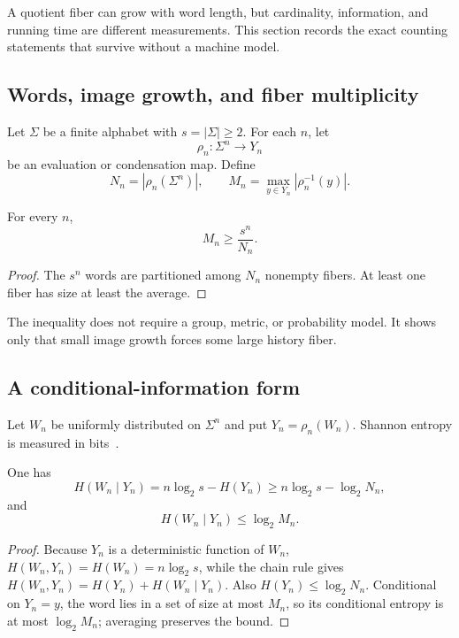 A quotient fiber can grow with word length, but cardinality, information, and
running time are different measurements.  This section records the exact
counting statements that survive without a machine model.

\subsection{Words, image growth, and fiber multiplicity}

Let $\Sigma$ be a finite alphabet with $s=|\Sigma|\ge2$.  For each $n$, let
\[
  \rho_n:\Sigma^n\longrightarrow Y_n
\]
be an evaluation or condensation map.  Define
\[
  N_n=|\rho_n(\Sigma^n)|,
  \qquad
  M_n=\max_{y\in Y_n}|\rho_n^{-1}(y)|.
\]

\begin{proposition}
\label{prop:fiber-image-inequality}
For every $n$,
\begin{equation}
  M_n\ge \frac{s^n}{N_n}.
  \label{eq:fiber-image-inequality}
\end{equation}
\end{proposition}

\begin{proof}
The $s^n$ words are partitioned among $N_n$ nonempty fibers.  At least one
fiber has size at least the average.
\end{proof}

The inequality does not require a group, metric, or probability model.  It
shows only that small image growth forces some large history fiber.

\subsection{A conditional-information form}

Let $W_n$ be uniformly distributed on $\Sigma^n$ and put
$Y_n=\rho_n(W_n)$.  Shannon entropy is measured in bits~\cite{Shannon1948}.

\begin{proposition}
\label{prop:evaluation-information-loss}
One has
\begin{equation}
 H(W_n\mid Y_n)
 =n\log_2s-H(Y_n)
 \ge n\log_2s-\log_2N_n,
 \label{eq:conditional-information-loss}
\end{equation}
and
\[
  H(W_n\mid Y_n)\le\log_2M_n.
\]
\end{proposition}

\begin{proof}
Because $Y_n$ is a deterministic function of $W_n$,
$H(W_n,Y_n)=H(W_n)=n\log_2s$, while the chain rule gives
$H(W_n,Y_n)=H(Y_n)+H(W_n\mid Y_n)$.  Also
$H(Y_n)\le\log_2N_n$.  Conditional on $Y_n=y$, the word lies in a set of size
at most $M_n$, so its conditional entropy is at most $\log_2M_n$; averaging
preserves the bound.
\end{proof}

